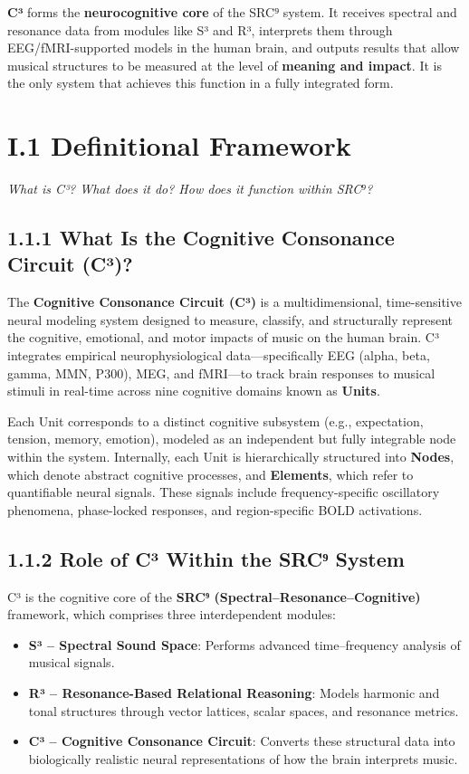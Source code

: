 \documentclass[10pt]{article}
\begin{document}
\textbf{C³} forms the \textbf{neurocognitive core} of the SRC⁹ system. It receives spectral and resonance data from modules like S³ and R³, interprets them through EEG/fMRI-supported models in the human brain, and outputs results that allow musical structures to be measured at the level of \textbf{meaning and impact}. It is the only system that achieves this function in a fully integrated form.


\section*{I.1 Definitional Framework}

\textit{What is C³? What does it do? How does it function within SRC⁹?}

\subsection*{1.1.1 What Is the Cognitive Consonance Circuit (C³)?}

The \textbf{Cognitive Consonance Circuit (C³)} is a multidimensional, time-sensitive neural modeling system designed to measure, classify, and structurally represent the cognitive, emotional, and motor impacts of music on the human brain. C³ integrates empirical neurophysiological data—specifically EEG (alpha, beta, gamma, MMN, P300), MEG, and fMRI—to track brain responses to musical stimuli in real-time across nine cognitive domains known as \textbf{Units}.

Each Unit corresponds to a distinct cognitive subsystem (e.g., expectation, tension, memory, emotion), modeled as an independent but fully integrable node within the system. Internally, each Unit is hierarchically structured into \textbf{Nodes}, which denote abstract cognitive processes, and \textbf{Elements}, which refer to quantifiable neural signals. These signals include frequency-specific oscillatory phenomena, phase-locked responses, and region-specific BOLD activations.

\subsection*{1.1.2 Role of C³ Within the SRC⁹ System}

C³ is the cognitive core of the \textbf{SRC⁹ (Spectral–Resonance–Cognitive)} framework, which comprises three interdependent modules:

\begin{itemize}
    \item \textbf{S³ – Spectral Sound Space}: Performs advanced time–frequency analysis of musical signals.
    \item \textbf{R³ – Resonance-Based Relational Reasoning}: Models harmonic and tonal structures through vector lattices, scalar spaces, and resonance metrics.
    \item \textbf{C³ – Cognitive Consonance Circuit}: Converts these structural data into biologically realistic neural representations of how the brain interprets music.
\end{itemize}
\end{document}
